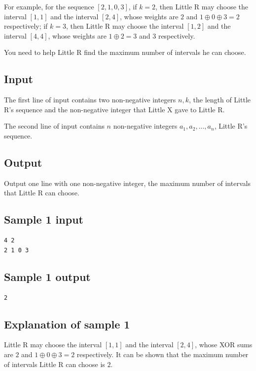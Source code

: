 \documentclass[11pt]{article}
\begin{document}
For example, for the sequence $[2, 1, 0, 3]$,
if $k = 2$, then Little R may choose the interval $[1, 1]$ and the
interval $[2, 4]$, whose weights are $2$ and $1 \oplus 0 \oplus 3 = 2$
respectively;
if $k = 3$, then Little R may choose the interval $[1, 2]$ and the
interval $[4, 4]$, whose weights are $1 \oplus 2 = 3$ and $3$
respectively.

You need to help Little R find the maximum number of intervals he can
choose.

\subsection*{Input}

The first line of input contains two non-negative integers $n, k$,
the length of Little R's sequence and the non-negative integer that
Little X gave to Little R.

The second line of input contains $n$ non-negative integers
$a_1, a_2, \dots, a_n$, Little R's sequence.

\subsection*{Output}

Output one line with one non-negative integer,
the maximum number of intervals that Little R can choose.

\subsection*{Sample 1 input}
\begin{verbatim}
4 2
2 1 0 3
\end{verbatim}

\subsection*{Sample 1 output}
\begin{verbatim}
2
\end{verbatim}

\subsection*{Explanation of sample 1}

Little R may choose the interval $[1, 1]$ and the interval $[2, 4]$,
whose XOR sums are $2$ and $1 \oplus 0 \oplus 3 = 2$ respectively.
It can be shown that the maximum number of intervals Little R can choose
is $2$.
\end{document}
